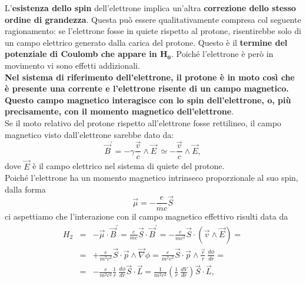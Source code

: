 L'\textbf{esistenza dello spin} dell'elettrone implica un'altra \textbf{correzione dello stesso ordine di grandezza}. Questa può essere qualitativamente compresa col seguente ragionamento: se l'elettrone fosse in quiete rispetto al protone, risentirebbe solo di un campo elettrico generato dalla carica del protone. Questo è il \textbf{termine del potenziale di Coulomb che appare in $\boldsymbol{H_0}$}. Poiché l'elettrone è però in movimento vi sono effetti addizionali. \\
\textbf{Nel sistema di riferimento dell'elettrone, il protone è in moto così che è presente una corrente e l'elettrone risente di un campo magnetico. Questo campo magnetico interagisce con lo spin dell'elettrone, o, più precisamente, con il momento magnetico dell'elettrone}. \\
Se il moto relativo del protone rispetto all'elettrone fosse rettilineo, il campo magnetico visto dall'elettrone sarebbe dato da:
\begin{equation} 
\vec{B}^{'}=-\gamma \frac{\vec{v}}{c} \wedge \vec{E} \ \simeq -\frac{\vec{v}}{c} \wedge \vec{E} ,
\end{equation}
dove $\vec{E}$ è il campo elettrico nel sistema di quiete del protone. \\
Poiché l'elettrone ha un momento magnetico intrinseco proporzionale al suo spin, dalla forma
\begin{equation} 
\vec{\mu}=-\frac{e}{mc}\vec{S} 
\end{equation}
ci aspettiamo che l'interazione con il campo magnetico effettivo risulti data da
\begin{eqnarray}
H_2 & =& -\vec{\mu} \cdot \vec{B}^{'}=\frac{e}{mc} \vec{S} \cdot \vec{B}^{'}= -\frac{e}{mc^2}\vec{S} \cdot \left( \vec{v} \wedge \vec{E} \right)= \nonumber \\
& =& + \frac{e}{m^2c^2}\vec{S} \cdot \vec{p} \wedge \vec{\nabla}\phi= \frac{e}{m^2c^2}\vec{S} \cdot \vec{p} \wedge \frac{\vec{r}}{r} \ \frac{d\phi}{dr}= \nonumber \\
& = &-\frac{e}{m^2c^2}\frac{1}{r} \ \frac{d\phi}{dr}\vec{S} \cdot \vec{L}= \frac{1}{m^2c^2} \left( \frac{1}{r} \ \frac{dV}{dr} \right) \vec{S} \cdot \vec{L} ,
\end{eqnarray}

